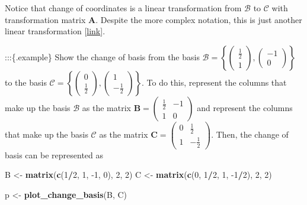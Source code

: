 \documentclass[
]{book}
\newenvironment{Shaded}{\begin{snugshade}}{\end{snugshade}}
\newcommand{\DecValTok}[1]{\textcolor[rgb]{0.00,0.00,0.81}{#1}}
\newcommand{\KeywordTok}[1]{\textcolor[rgb]{0.13,0.29,0.53}{\textbf{#1}}}
\newcommand{\NormalTok}[1]{#1}
\newcommand{\OperatorTok}[1]{\textcolor[rgb]{0.81,0.36,0.00}{\textbf{#1}}}
\newcommand{\StringTok}[1]{\textcolor[rgb]{0.31,0.60,0.02}{#1}}
\theoremstyle{definition}
\theoremstyle{definition}
\theoremstyle{definition}
\theoremstyle{definition}
\theoremstyle{remark}
\begin{document}
Notice that change of coordinates is a linear transformation from \(\mathcal{B}\) to \(\mathcal{C}\) with transformation matrix \(\mathbf{A}\). Despite the more complex notation, this is just another linear transformation {[}\href{https://www.youtube.com/watch?v=VGhij2qmOs4}{link}{]}.

:::\{.example\}
Show the change of basis from the basis \(\mathcal{B} = \left\{ \begin{pmatrix} \frac{1}{2} \\ 1 \end{pmatrix}, \begin{pmatrix} -1 \\ 0 \end{pmatrix}\right\}\) to the basis \(\mathcal{C} = \left\{ \begin{pmatrix} 0 \\ \frac{1}{2} \end{pmatrix}, \begin{pmatrix} 1 \\ -\frac{1}{2} \end{pmatrix}\right\}\). To do this, represent the columns that make up the basis \(\mathcal{B}\) as the matrix \(\mathbf{B} = \begin{pmatrix} \frac{1}{2} & -1 \\ 1 & 0 \end{pmatrix}\) and represent the columns that make up the basis \(\mathcal{C}\) as the matrix \(\mathbf{C} = \begin{pmatrix} 0 & \frac{1}{2} \\ 1 & -\frac{1}{2} \end{pmatrix}\). Then, the change of basis can be represented as

\begin{Shaded}
\begin{Highlighting}[]
\NormalTok{B <-}\StringTok{ }\KeywordTok{matrix}\NormalTok{(}\KeywordTok{c}\NormalTok{(}\DecValTok{1}\OperatorTok{/}\DecValTok{2}\NormalTok{, }\DecValTok{1}\NormalTok{, }\DecValTok{-1}\NormalTok{, }\DecValTok{0}\NormalTok{), }\DecValTok{2}\NormalTok{, }\DecValTok{2}\NormalTok{)}
\NormalTok{C <-}\StringTok{ }\KeywordTok{matrix}\NormalTok{(}\KeywordTok{c}\NormalTok{(}\DecValTok{0}\NormalTok{, }\DecValTok{1}\OperatorTok{/}\DecValTok{2}\NormalTok{, }\DecValTok{1}\NormalTok{, }\DecValTok{-1}\OperatorTok{/}\DecValTok{2}\NormalTok{), }\DecValTok{2}\NormalTok{, }\DecValTok{2}\NormalTok{)}

\NormalTok{p <-}\StringTok{ }\KeywordTok{plot_change_basis}\NormalTok{(B, C)}
\end{Highlighting}
\end{Shaded}
\end{document}
